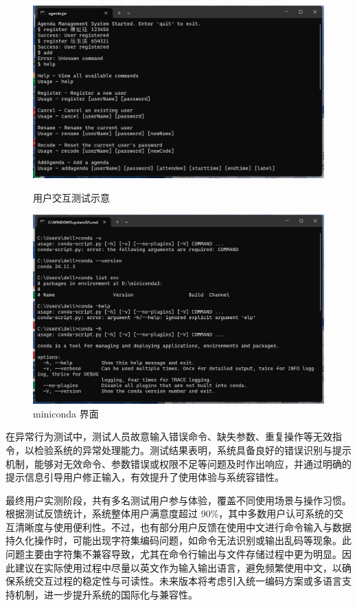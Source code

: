 \documentclass[a4paper, twoside, utf8]{ctexart}
\begin{document}
    \begin{figure}[htbp]
        \begin{minipage}{.5\textwidth}
            \centering
            \includegraphics[height=.15\textheight]{figure/ui.png}
            \caption{用户交互测试示意}
        \end{minipage}
        \begin{minipage}{.45\textwidth}
            \centering
            \includegraphics[height=.15\textheight]{figure/conda.png}
            \caption{miniconda 界面}
        \end{minipage}
    \end{figure}

    在异常行为测试中，测试人员故意输入错误命令、缺失参数、重复操作等无效指令，以检验系统的异常处理能力。测试结果表明，系统具备良好的错误识别与提示机制，能够对无效命令、参数错误或权限不足等问题及时作出响应，并通过明确的提示信息引导用户修正输入，有效提升了使用体验与系统容错性。

    最终用户实测阶段，共有多名测试用户参与体验，覆盖不同使用场景与操作习惯。根据测试反馈统计，系统整体用户满意度超过 90\%，其中多数用户认可系统的交互清晰度与使用便利性。不过，也有部分用户反馈在使用中文进行命令输入与数据持久化操作时，可能出现字符集编码问题，如命令无法识别或输出乱码等现象。此问题主要由字符集不兼容导致，尤其在命令行输出与文件存储过程中更为明显。因此建议在实际使用过程中尽量以英文作为输入输出语言，避免频繁使用中文，以确保系统交互过程的稳定性与可读性。未来版本将考虑引入统一编码方案或多语言支持机制，进一步提升系统的国际化与兼容性。
	
\end{document}
